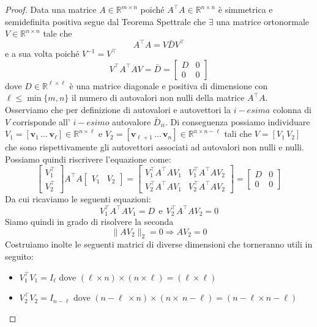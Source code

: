 \documentclass[11pt]{article}
\newcommand{\R}{\mathbb{R}}
\begin{document}
\begin{proof}
Data una matrice $A \in \R^{m \times n}$ poiché $A^\top      A \in \R^{n \times n}$ è simmetrica e semidefinita positiva segue dal Teorema Spettrale che $\exists$ una matrice ortonormale $V \in \R^{n \times n}$ tale che $$ A^\top      A=V\bar{D}V^\top      $$ e a sua volta poiché $V^{-1}=V^\top      $ $$V^\top      A^\top      AV=\bar{D}= \begin{bmatrix}D & 0 \\ 0 & 0\end{bmatrix}$$
dove $D \in \R^{\ell \times \ell}$ è una matrice diagonale e positiva di dimensione con $\ell \leq \min{\{m,n\}}$ il numero di autovalori non nulli della matrice $A^\top      A$. 
Osserviamo che per definizione di autovalori e autovettori la $i-esima$ colonna di $V$ corrisponde all' $i-esimo$ autovalore $\bar{D}_{ii}$. Di conseguenza possiamo individuare $V_1=[\mathbf{v}_1 \, \dots \, \mathbf{v}_{\ell}] \in \R^{n \times \ell}$ e $V_2=[\mathbf{v}_{\ell+1} \, \dots \, \mathbf{v}_n] \in \R^{n \times n-\ell}$ tali che $V=[V_1 \, V_2]$ che sono rispettivamente gli autovettori associati ad autovalori non nulli e nulli. 
Possiamo quindi riscrivere l'equazione come:
$$ \begin{bmatrix} V_1^\top       \\ V_2^\top       \end{bmatrix}
A^\top      A \begin{bmatrix} V_1 & \!\! V_2 \end{bmatrix}
= \begin{bmatrix}  V_1^\top      A^\top      AV_1 & V_1^\top      A^\top      AV_2 \\
  V_2^\top      A^\top      AV_1 & V_2^\top      A^\top      AV_2
\end{bmatrix} = \begin{bmatrix} D & 0 \\ 0 & 0 \end{bmatrix}$$
Da cui ricaviamo le seguenti equazioni:
$$V_1^\top      A^\top      AV_1=D \ \ \text{e} \ \ V_2^\top      A^\top      AV_2=0$$ 
Siamo quindi in grado di risolvere la seconda
$$\|AV_2\|_2=0 \Rightarrow AV_2=0$$ 
Costruiamo inolte le seguenti matrici di diverse dimensioni che torneranno utili in seguito:\\
\begin{itemize}
	\item$V_1^\top      V_1=I_{\ell}$ dove $(\ell \times n)\times(n \times \ell)=(\ell \times \ell)$
	\item$V_2^\top      V_2=I_{n-\ell}$ dove $(n-\ell \ \times n)\times(n \times \ n-\ell)=(n-\ell \times n-\ell)$

\end{itemize}
\end{proof}
\end{document}
